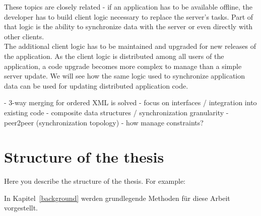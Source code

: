 These topics are closely related - if an application has to be available offline, the developer has to build client logic necessary to replace the server's tasks. Part of that logic is the ability to synchronize data with the server or even directly with other clients.\\
The additional client logic has to be maintained and upgraded for new releases of the application. As the client logic is distributed among all users of the application, a code upgrade becomes more complex to manage than a simple server update. We will see how the same logic used to synchronize application data can be used for updating distributed application code.

- 3-way merging for ordered XML is solved
- focus on interfaces / integration into existing code
- composite data structures / synchronization granularity
- peer2peer (synchronization topology)
- how manage constraints?

\section{Structure of the thesis}
Here you describe the structure of the thesis. For example:

In Kapitel~\ref{background} werden grundlegende Methoden für diese Arbeit vorgestellt.